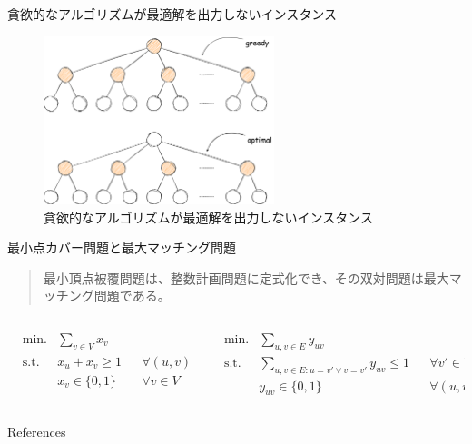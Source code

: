 \documentclass[aspectratio=169]{beamer}
\begin{document}
\begin{frame}{貪欲的なアルゴリズムが最適解を出力しないインスタンス \cite{epsilon2024}}
	\begin{figure}
		\centering
		\includegraphics[width=0.6\textwidth]{figures/greedy-fails.png}
		\caption{貪欲的なアルゴリズムが最適解を出力しないインスタンス}
	\end{figure}
\end{frame}

\begin{frame}{最小点カバー問題と最大マッチング問題}
	\begin{quote}
		最小頂点被覆問題は、整数計画問題に定式化でき、その双対問題は最大マッチング問題である。\cite{wikipedia2021}
	\end{quote}

	\begin{columns}[t]
		\begin{column}{0.5\textwidth}
			\begin{align*}
				 & \text{min.}  & \sum_{v \in V} x_v                           \\
				 & \text{s.t. } & x_u + x_v \ge 1    &  & \forall (u, v) \in E \\
				 &              & x_v \in \{0, 1\}   &  & \forall v \in V
			\end{align*}
		\end{column}
		\begin{column}{0.5\textwidth}
			\begin{align*}
				 & \text{min.}  & \sum_{u,v \in E} y_{uv}                                                   \\
				 & \text{s.t. } & \sum_{u,v \in E : u=v' \lor v=v' } y_{uv} \le 1 &  & \forall v' \in V     \\
				 &              & y_{uv} \in \{0, 1\}                             &  & \forall (u, v) \in E
			\end{align*}
		\end{column}
	\end{columns}
\end{frame}

\begin{frame}[allowframebreaks]{References}
	\printbibliography{}
\end{frame}
\end{document}
